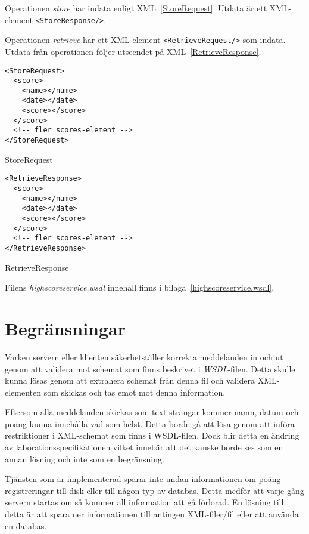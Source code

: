 \documentclass[a4paper, 12pt]{article}
\begin{document}
Operationen \textit{store} har indata enligt
XML~\ref{StoreRequest}. Utdata är ett XML-element
\verb!<StoreResponse/>!.

Operationen \textit{retrieve} har ett XML-element
\verb!<RetrieveRequest/>! som indata. Utdata från operationen följer
utseendet på XML~\ref{RetrieveResponse}.

\begin{xml}
\begin{verbatim}
<StoreRequest>
  <score>
    <name></name>
    <date></date>
    <score></score>
  </score>
  <!-- fler scores-element -->
</StoreRequest>
\end{verbatim}
  \caption{StoreRequest}\label{StoreRequest}
\end{xml}


\begin{xml}
\begin{verbatim}
<RetrieveResponse>
  <score>
    <name></name>
    <date></date>
    <score></score>
  </score>
  <!-- fler scores-element -->
</RetrieveResponse>
\end{verbatim}
  \caption{RetrieveResponse}\label{RetrieveResponse}
\end{xml}

Filens \textit{highscoreservice.wsdl} innehåll finns i
bilaga~\ref{highscoreservice.wsdl}.

\section{Begränsningar}\label{Begransningar}
Varken servern eller klienten säkerhetställer korrekta meddelanden in
och ut genom att validera mot schemat som finns beskrivet i
\textit{WSDL}-filen. Detta skulle kunna lösas genom att extrahera
schemat från denna fil och validera XML-elementen som skickas och tas
emot mot denna information.

Eftersom alla meddelanden skickas som text-strängar kommer namn, datum
och poäng kunna innehålla vad som helst. Detta borde gå att lösa genom
att införa restriktioner i XML-schemat som finns i WSDL-filen. Dock
blir detta en ändring av laborationsspecifikationen vilket innebär att
det kanske borde ses som en annan lösning och inte som en begränsning.

Tjänsten som är implementerad sparar inte undan informationen om
poäng-registreringar till disk eller till någon typ av databas. Detta
medför att varje gång servern startas om så kommer all information att
gå förlorad. En lösning till detta är att spara ner informationen till
antingen XML-filer/fil eller att använda en databas.
\end{document}
